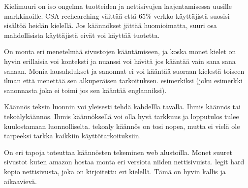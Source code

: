 \documentclass[11pt,a4paper,titlepage,oneside]{article}
\begin{document}
Kielimuuri on iso ongelma tuotteiden ja nettisivujen laajentamisessa uusille markkinoille.
CSA rechearching väittää että 65\% verkko käyttäjistä suosisi sisältöä heidän kielellä.
Jos käännökset jättää huomioimatta, suuri osa mahdollisista käyttäjistä eivät voi käyttää tuotetta.
\medskip







On monta eri menetelmää sivustojen kääntämiseen, 
ja koska monet kielet on hyvin erillaisia voi konteksti ja nuanssi voi hävitä jos kääntää vain sana sana sanaan.
Monia lausahdukset ja sanonnat ei voi kääntää suoraan kielestä toiseen ilman että menettää sen alkuperäisen tarkoituksen. \citemissing
esimerkiksi (joku esimerkki sanonnasta joka ei toimi jos sen kääntää englanniksi).%
\medskip


Käännös teksin luonnin voi yleisesti tehdä kahdellla tavalla. Ihmis käännös tai tekoälykäännös.
Ihmis käännöksellä voi olla hyvä tarkkuus ja lopputulos tulee kuulostamaan luonnolliselta.
tekoaly käännös on tosi nopea, mutta ei vielä ole tarpeeksi tarkka kaikkiin käyttötarkoituksiin.\citemissing
\medskip











On eri tapoja toteuttaa käännösten tekeminen web alustoilla. Monet suuret sivustot kuten amazon \citemissing{}  
hostaa monta eri versiota niiden nettisivuista.
legit hard kopio nettisivusta, joka on kirjoitettu eri kielellä. Tämä on hyvin kallis ja aikaavievä.
\end{document}
